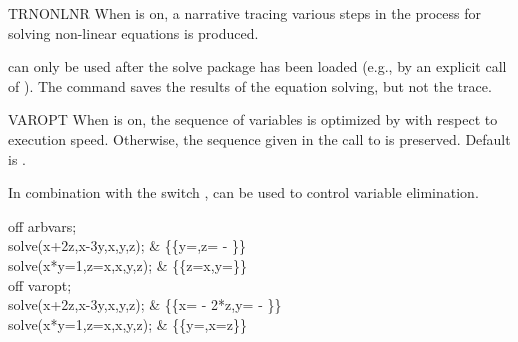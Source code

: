 \begin{Switch}[trnonlnr]{TRNONLNR}
When  is on, a narrative tracing various steps in
the process for solving non-linear equations is produced.

\begin{Comments}
 can only be used after the solve package has been loaded
(e.g., by an explicit call of ).  The 
command saves the results of the equation solving, but not the trace.
\end{Comments}
\end{Switch}


\begin{Switch}[varopt]{VAROPT}
When  is on, the sequence of variables is optimized by
 with respect to execution speed. Otherwise, the sequence
given in the call to  is preserved. Default is .

In combination with the switch ,  can be used
to control variable elimination.

\begin{Examples}
off arbvars; \\
solve({x+2z,x-3y},{x,y,z});				&
		   \{\{y=,z= - \}\} \\
solve({x*y=1,z=x},{x,y,z});				&
		   \{\{z=x,y=\}\} \\
off varopt; \\
solve({x+2z,x-3y},{x,y,z});				&
		   \{\{x= - 2*z,y= - \}\} \\
solve({x*y=1,z=x},{x,y,z});				&
		   \{\{y=,x=z\}\} \\
\end{Examples}
\end{Switch}


